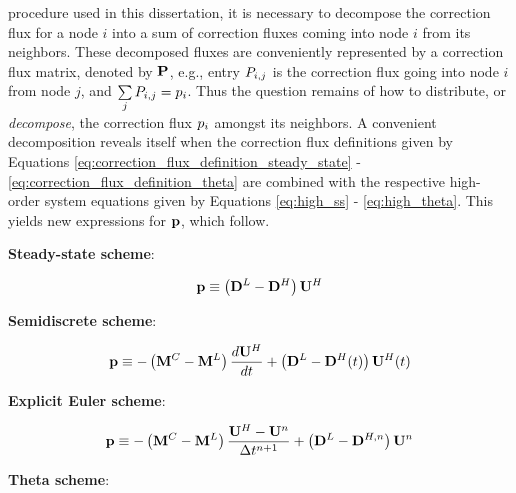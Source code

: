 procedure used in this dissertation, it is necessary to decompose the
correction flux for a node $i$ into a sum of correction fluxes coming into node
$i$ from its neighbors. These decomposed fluxes are conveniently represented by
a correction flux matrix, denoted by $\correctionfluxmatrix$, e.g., entry
$\MakeUppercase{\correctionfluxletter}\ij$ is the correction flux going into node
$i$ from node $j$, and $\sumj\MakeUppercase{\correctionfluxletter}\ij =
\correctionfluxletter_i$. Thus the question remains of how to distribute, or
\emph{decompose}, the correction flux $p_i$ amongst its
neighbors.  A convenient decomposition reveals itself when the correction flux
definitions given by Equations
\eqref{eq:correction_flux_definition_steady_state}
- \eqref{eq:correction_flux_definition_theta} are combined with the respective
high-order system equations given by Equations \eqref{eq:high_ss} -
\eqref{eq:high_theta}. This yields new expressions for $\mathbf{p}$,
which follow.
\begin{center}{\textbf{Steady-state scheme}:}\end{center}
\begin{equation}\label{eq:correction_flux_steady_state}
  \correctionfluxvector \equiv \pr{\loworderdiffusionmatrix
    - \highorderdiffusionmatrix}\highordersolution
\end{equation}
\begin{center}{\textbf{Semidiscrete scheme}:}\end{center}
\begin{equation}\label{eq:correction_flux_semidiscrete}
  \correctionfluxvector \equiv -\pr{\consistentmassmatrix
    - \lumpedmassmatrix}\ddt{\highordersolution}
  + \pr{\loworderdiffusionmatrix - \highorderdiffusionmatrix(\timevalue)}
    \highordersolution(\timevalue)
\end{equation}
\begin{center}{\textbf{Explicit Euler scheme}:}\end{center}
\begin{equation}\label{eq:correction_flux_explicit_euler}
  \correctionfluxvector \equiv -\pr{\consistentmassmatrix
    - \lumpedmassmatrix}\frac{\highordersolution-\solutionvector^\timeindex}
    {\timestepsize^{\timeindex+1}}
  + \pr{\loworderdiffusionmatrix
    - \highorderdiffusionmatrix[\timeindex]}\solutionvector^\timeindex
\end{equation}
\begin{center}{\textbf{Theta scheme}:}\end{center}
